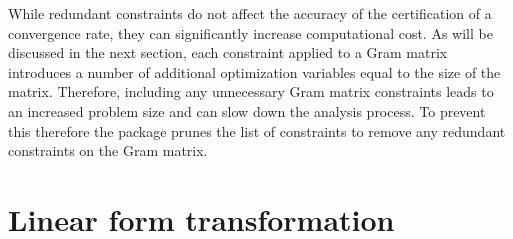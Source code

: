 While redundant constraints do not affect the accuracy of the certification of a convergence rate, they can significantly increase computational cost. As will be discussed in the next section, each constraint applied to a Gram matrix introduces a number of additional optimization variables equal to the size of the matrix. Therefore, including any unnecessary Gram matrix constraints leads to an increased problem size and can slow down the analysis process. To prevent this therefore the package prunes the list of constraints to remove any redundant constraints on the Gram matrix.

\section{Linear form transformation} \label{sec_linearform}


